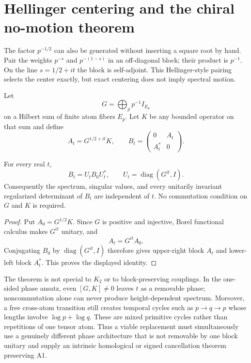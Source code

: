 \section{Hellinger centering and the chiral no-motion theorem}
\label{sec:chiral}

The factor $p^{-1/2}$ can also be generated without inserting a square root
by hand. Pair the weights $p^{-s}$ and $p^{-(1-s)}$ in an off-diagonal block;
their product is $p^{-1}$. On the line $s=1/2+it$ the block is self-adjoint.
This Hellinger-style pairing selects the center exactly, but exact centering
does not imply spectral motion.

Let
\[
 G=\bigoplus_{p}p^{-1}I_{E_p}
\]
on a Hilbert sum of finite atom fibers $E_p$. Let $K$ be any bounded operator
on that sum and define
\[
 A_t=G^{1/2+it}K,
 \qquad
 B_t=\begin{pmatrix}0&A_t\\A_t^*&0\end{pmatrix}.
\]

\begin{theorem}
\label{thm:no-motion}
For every real $t$,
\[
 B_t=U_tB_0U_t^*,
 \qquad
 U_t=\operatorname{diag}(G^{it},I).
\]
Consequently the spectrum, singular values, and every unitarily invariant
regularized determinant of $B_t$ are independent of $t$. No commutation
condition on $G$ and $K$ is required.
\end{theorem}

\begin{proof}
Put $A_0=G^{1/2}K$. Since $G$ is positive and injective, Borel functional
calculus makes $G^{it}$ unitary, and
\[
 A_t=G^{it}A_0.
\]
Conjugating $B_0$ by $\operatorname{diag}(G^{it},I)$ therefore gives upper-right
block $A_t$ and lower-left block $A_t^*$. This proves the displayed identity.
\end{proof}

The theorem is not special to $K_2$ or to block-preserving couplings. In the
one-sided phase ansatz, even $[G,K]\ne0$ leaves $t$ as a removable phase;
noncommutation alone can never produce height-dependent spectrum. Moreover,
a free cross-atom transition still creates temporal cycles such as
$p\to q\to p$ whose lengths involve $\log p+\log q$. These are mixed
primitive cycles rather than repetitions of one tensor atom. Thus a viable
replacement must simultaneously use a genuinely different phase architecture
that is not removable by one block unitary and supply an intrinsic
homological or signed cancellation theorem preserving A1.

